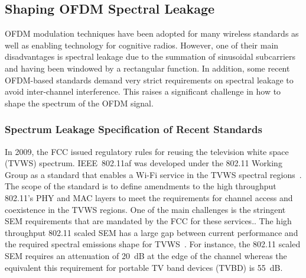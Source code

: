 \subsection{Shaping OFDM Spectral Leakage}
\label{Ch2:SpecLeak}
OFDM modulation techniques have been adopted for many wireless standards as well as enabling technology for cognitive radios.
However, one of their main disadvantages is spectral leakage due to the summation of sinusoidal subcarriers and having been windowed by a rectangular function.
In addition, some recent OFDM-based standards demand very strict requirements on spectral leakage to avoid inter-channel interference.
This raises a significant challenge in how to shape the spectrum of the OFDM signal. 

\subsubsection{Spectrum Leakage Specification of Recent Standards}
In 2009, the FCC issued regulatory rules for reusing the television white space (TVWS) spectrum.
IEEE~802.11af was developed under the 802.11 Working Group as a standard that enables a Wi-Fi service in the TVWS spectral regions~\cite{802-11af2013}. 
The scope of the standard is to define amendments to the high throughput 802.11's PHY and MAC layers to meet the requirements for channel access and coexistence in the TVWS regions.
One of the main challenges is the stringent SEM requirements that are mandated by the FCC for these services.. 
The high throughput 802.11 scaled SEM has a large gap between current performance and the required spectral emissions shape for TVWS~\cite{Shellhammer2009}.
For instance, the 802.11 scaled SEM requires an attenuation of 20~dB at the edge of the channel whereas the equivalent this requirement for portable TV band devices (TVBD) is 55~dB.

